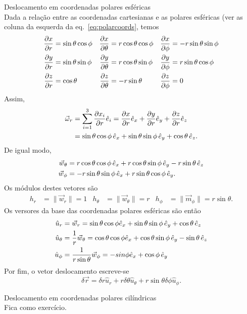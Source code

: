 \begin{examples}
\item Deslocamento em coordenadas polares esféricas\\
\label{ex:drsph}
Dada a relação entre as coordenadas cartesianas e as polares esféricas (ver as
coluna da esquerda da eq.~\eqref{eq:polarcoords}, temos
\begin{align*}
\frac{\partial x}{\partial r}&=\sin\theta\cos\phi &
\frac{\partial x}{\partial \theta}&=r\cos\theta\cos\phi &
\frac{\partial x}{\partial \phi}&=-r\sin\theta\sin\phi\\
\frac{\partial y}{\partial r}&=\sin\theta\sin\phi &
\frac{\partial y}{\partial \theta}&=r\cos\theta\sin\phi &
\frac{\partial y}{\partial \phi}&=r\sin\theta\cos\phi\\
\frac{\partial z}{\partial r}&=\cos\theta&
\frac{\partial z}{\partial \theta}&=-r\sin\theta&
\frac{\partial z}{\partial \phi}&=0
\end{align*}
Assim,
\begin{align*}
\vec\omega_r&=\sum_{i=1}^3\pd{x_i}{r}\he_i=
\pd{x}{r}\he_x+
\pd{y}{r}\he_y+
\pd{z}{r}\he_z\\
&=\sin\theta\cos\phi\,\he_x+\sin\theta\sin\phi\,\he_y+\cos\theta\,\he_z.
\end{align*}
De igual modo,
\begin{align*}
\vec w_\theta&=
    r\cos\theta\cos\phi\,\he_x+r\cos\theta\sin\phi\,\he_y-r\sin\theta\,\he_z\\
\vec w_\phi&= -r\sin\theta\sin\phi\,\he_x+r\sin\theta\cos\phi\,\he_y.
\end{align*}
Os módulos destes vetores são
\begin{align*}
h_r&=\|\vec w_r\|=1 &
h_\theta &=\|\vec w_\theta\|=r &
h_\phi&=\|\vec m_\phi\|=r\sin\theta.
\end{align*}
Os versores da base das coordenadas polares esféricas são então
\begin{align*}
\hat u_r&=\vec w_r=
    \sin\theta\cos\phi\he_x+\sin\theta\sin\phi\,\he_y+\cos\theta\,\he_z\\
\hat u_\theta&=\frac{1}{r}\vec w_\theta=
    \cos\theta\cos\phi\he_x+\cos\theta\sin\phi\,\he_y-\sin\theta\,\he_z\\
\hat u_\phi&=\frac{1}{r\sin\theta}\vec w_\phi=
    -sin\phi\he_x+\cos\phi\,\he_y
\end{align*}
Por fim, o vetor deslocamento escreve-se
\begin{equation*}
\delta\vec r = \delta r\hat u_r+ r\delta\theta\hat
u_\theta+r\sin\theta\delta\phi\hat u_\phi.
\end{equation*}

\item Deslocamento em coordenadas polares cilíndricas\\
Fica como exercício.
\end{examples}



